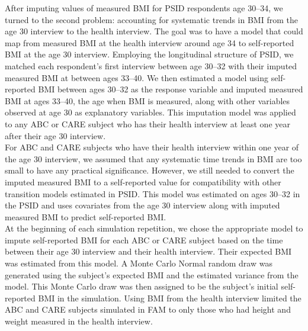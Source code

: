\noindent After imputing values of measured BMI for PSID respondents age 30--34, we turned to the second problem: accounting for systematic trends in BMI from the age 30 interview to the health interview.  The goal was to have a model that could map from measured BMI at the health interview around age 34 to self-reported BMI at the age 30 interview.  Employing the longitudinal structure of PSID, we matched each respondent's first interview between age 30--32 with their imputed measured BMI at between ages 33--40.  We then estimated a model using self-reported BMI between ages 30--32 as the response variable and imputed measured BMI at ages 33--40, the age when BMI is measured, along with other variables observed at age 30 as explanatory variables. This imputation model was applied to any ABC or CARE subject who has their health interview at least one year after their age 30 interview.\\

\noindent For ABC and CARE subjects who have their health interview within one year of the age 30 interview, we assumed that any systematic time trends in BMI are too small to have any practical significance.  However, we still needed to convert the imputed measured BMI to a self-reported value for compatibility with other transition models estimated in PSID.  This model was estimated on ages 30--32 in the PSID and uses covariates from the age 30 interview along with imputed measured BMI to predict self-reported BMI. \\

\noindent At the beginning of each simulation repetition, we chose the appropriate model to impute self-reported BMI for each ABC or CARE subject based on the time between their age 30 interview and their health interview. Their expected BMI was estimated from this model. A Monte Carlo Normal random draw was generated using the subject's expected BMI and the estimated variance from the model. This Monte Carlo draw was then assigned to be the subject's initial self-reported BMI in the simulation. Using BMI from the health interview limited the ABC and CARE subjects simulated in FAM to only those who had height and weight measured in the health interview. \\


